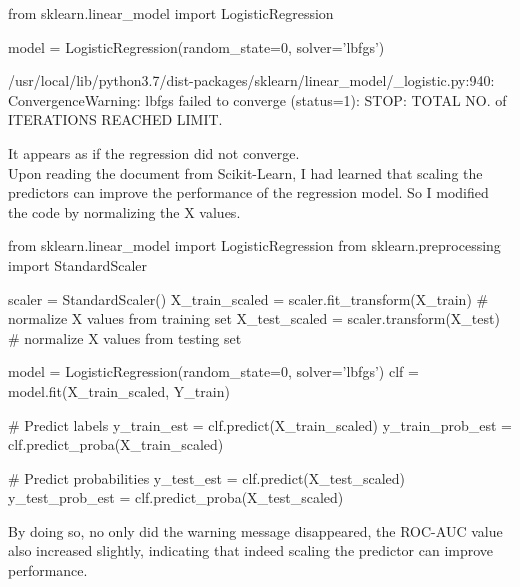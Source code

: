 \documentclass[11pt]{article}
\begin{document}
\begin{python}
    from sklearn.linear_model import LogisticRegression

    model = LogisticRegression(random_state=0, solver='lbfgs')

/usr/local/lib/python3.7/dist-packages/sklearn/linear_model/_logistic.py:940: ConvergenceWarning: lbfgs failed to converge (status=1):
STOP: TOTAL NO. of ITERATIONS REACHED LIMIT.
\end{python}
\vspace{1em}  
It appears as if the regression did not converge. \\
Upon reading the document from Scikit-Learn, I had learned that scaling the predictors can improve the performance 
of the regression model. So I modified the code by normalizing the X values.
\vspace{1em}  
\begin{python}
from sklearn.linear_model import LogisticRegression
from sklearn.preprocessing import StandardScaler

scaler = StandardScaler()
X_train_scaled = scaler.fit_transform(X_train)  # normalize X values from training set
X_test_scaled = scaler.transform(X_test)    # normalize X values from testing set

model = LogisticRegression(random_state=0, solver='lbfgs')
clf = model.fit(X_train_scaled, Y_train)

# Predict labels
y_train_est = clf.predict(X_train_scaled)
y_train_prob_est = clf.predict_proba(X_train_scaled)

# Predict probabilities
y_test_est = clf.predict(X_test_scaled)
y_test_prob_est = clf.predict_proba(X_test_scaled)
\end{python}
\vspace{1em}    
By doing so, no only did the warning message disappeared, the ROC-AUC value also increased slightly, indicating 
that indeed scaling the predictor can improve performance. 
\end{document}

